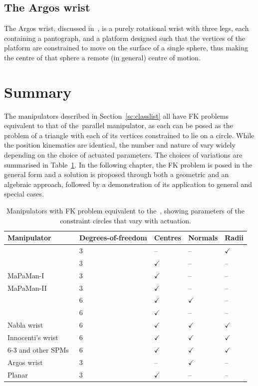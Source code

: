 \documentclass[DD]{iitmdiss}
\newcommand{\mref}[1]{\ref{#1}}
\newcommand{\mcite}[1]{\cite{#1}}
\newcommand{\mlabel}[1]{\label{#1}}
\begin{document}
\subsection{The Argos wrist} \mlabel{sc:argos}
%
The Argos wrist, discussed in~\mcite{vischer2000}, is a purely rotational wrist with three legs, each containing a pantograph, and a platform designed such that the vertices of the platform are constrained to move on the surface of a single sphere, thus making the centre of that sphere a remote (in general) centre of motion.
%
\section{Summary}
%
The manipulators described in Section~\mref{sc:classlist} all have FK problems equivalent to that of the~\rps parallel manipulator, as each can be posed as the problem of a triangle with each of its vertices constrained to lie on a circle. While the position kinematics are identical, the number and nature of \dofs vary widely depending on the choice of actuated parameters. The choices of variations are summarised in Table~\mref{tb:list}. In the following chapter, the FK problem is posed in the general form and a solution is proposed 
through both a geometric and an algebraic approach, followed by a demonstration of its application to general and special cases. 
%
\begin{table}[h!]
	\centering
	\caption{Manipulators with FK problem equivalent to the~\rps, showing parameters of the constraint circles that vary with actuation.}
	\mlabel{tb:list}
	\begin{tabular}{|m{4 cm}|m{2 cm}|m{2 cm}|m{2 cm}|m{2 cm}|}
		\hline
		Manipulator & Degrees-of-freedom & Centres & Normals & Radii \\[0.5ex] 
		\hline
		\rps~\cite{hunt1978} & $3$ & -- & -- & $\checkmark$ \\
		\rrs~\cite{rohit15} & $3$ & $\checkmark$ & -- & -- \\
		MaPaMan-I~\cite{arsb2012a} & $3$ & $\checkmark$ & -- & -- \\
		MaPaMan-II~\cite{arsb2012a} & $3$ & $\checkmark$ & -- & -- \\
		\rprs~\cite{venkatesan2014} & $6$ & $\checkmark$ & $\checkmark$ & -- \\
		\pprs~\cite{benhorin1998} & $6$ & $\checkmark$ & -- & -- \\
		Nabla wrist~\cite{merletbook} & $6$ & $\checkmark$ & $\checkmark$ & $\checkmark$ \\
		Innocenti's wrist~\cite{merletbook} & $6$ & $\checkmark$ & $\checkmark$ & $\checkmark$\\
		6-3 and other SPMs~\cite{merletbook} & $6$ & $\checkmark$ & $\checkmark$ & $\checkmark$ \\
		\hdashline
		Argos wrist~\cite{vischer2000} & $3$ & -- & $\checkmark$ & -- \\
		Planar~\rrr~\cite{baskar2017} & $3$ & $\checkmark$ & -- & -- \\
		\hline
	\end{tabular}
\end{table}
%
%
\end{document}
